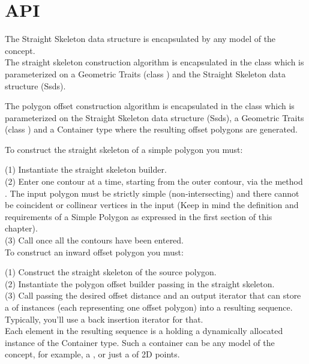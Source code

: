 \section{API}

The Straight Skeleton data structure is encapsulated by any model of the  concept.\\
The straight skeleton construction algorithm is encapsulated in the class  which is parameterized on a Geometric Traits (class ) and the Straight Skeleton data structure (Ssds).

The polygon offset construction algorithm is encapsulated in the class  which is parameterized on the Straight Skeleton data structure (Ssds), a Geometric Traits (class ) and a Container type where the resulting offset polygons are generated.

To construct the straight skeleton of a simple polygon you must:
 
(1) Instantiate the straight skeleton builder.\\
(2) Enter one contour at a time, starting from the outer contour, via the method . The input polygon must be strictly simple (non-intersecting) and there cannot be coincident or collinear vertices in the input (Keep in mind the definition and requirements of a Simple Polygon as expressed in the first section of this chapter).\\
(3) Call  once all the contours have been entered.\\

To construct an inward offset polygon you must:
 
(1) Construct the straight skeleton of the source polygon.\\
(2) Instantiate the polygon offset builder passing in the straight skeleton.\\
(3) Call  passing the desired offset distance and an output iterator that can store a  of  instances (each representing one offset polygon) into a resulting sequence. Typically, you'll use a back insertion iterator for that.\\
Each element in the resulting sequence is a  holding a dynamically allocated instance of the Container type. Such a container can be any model of the  concept, for example, a , or just a  of 2D points.

